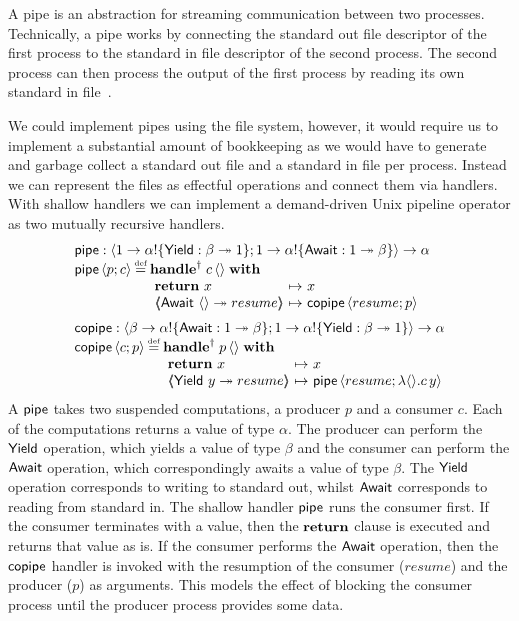 \documentclass[12pt,phd,lfcs,twoside,openright,logo,leftchapter,normalheadings]{infthesis}
\theoremstyle{plain}
\theoremstyle{definition}
\begin{document}
A \UNIX{} pipe is an abstraction for streaming communication between
two processes. Technically, a pipe works by connecting the standard
out file descriptor of the first process to the standard in file
descriptor of the second process. The second process can then process
the output of the first process by reading its own standard in
file~\cite{RitchieT74}.

We could implement pipes using the file system, however, it would
require us to implement a substantial amount of bookkeeping as we
would have to generate and garbage collect a standard out file and a
standard in file per process. Instead we can represent the files as
effectful operations and connect them via handlers.
%
With shallow handlers we can implement a demand-driven Unix pipeline
operator as two mutually recursive handlers.
%
\[
\bl
   \Pipe   : \Record{\UnitType \to \alpha \eff \{ \Yield : \beta \opto \UnitType \}; \UnitType \to \alpha\eff\{ \Await : \UnitType \opto \beta \}}          \to \alpha \\
   \Pipe\, \Record{p; c} \defas
        \bl
          \ShallowHandle\; c\,\Unit \;\With\; \\
           ~\ba[m]{@{}l@{~}c@{~}l@{}}
              \Return~x &\mapsto& x \\
              \OpCase{\Await}{\Unit}{resume}  &\mapsto& \Copipe\,\Record{resume; p} \\
            \ea
        \el\medskip\\

   \Copipe : \Record{\beta \to \alpha\eff\{ \Await : \UnitType \opto \beta\};    \UnitType \to \alpha\eff\{ \Yield : \beta \opto \UnitType\}} \to \alpha \\
   \Copipe\, \Record{c; p} \defas
      \bl
         \ShallowHandle\; p\,\Unit \;\With\; \\
          ~\ba[m]{@{}l@{~}c@{~}l@{}}
             \Return~x &\mapsto& x \\
             \OpCase{\Yield}{y}{resume} &\mapsto& \Pipe\,\Record{resume; \lambda \Unit. c\, y} \\
           \ea \\
      \el \\
\el
\]
%
A $\mathsf{pipe}$ takes two suspended computations, a producer $p$ and a
consumer $c$.
%
Each of the computations returns a value of type $\alpha$.
%
The producer can perform the $\mathsf{Yield}$ operation, which yields a value
of type $\beta$ and the consumer can perform the $\mathsf{Await}$ operation,
which correspondingly awaits a value of type $\beta$. The $\mathsf{Yield}$
operation corresponds to writing to standard out, whilst $\mathsf{Await}$
corresponds to reading from standard in.
%
The shallow handler $\mathsf{pipe}$ runs the consumer first. If the consumer
terminates with a value, then the $\mathbf{return}$ clause is executed and
returns that value as is. If the consumer performs the $\mathsf{Await}$
operation, then the $\mathsf{copipe}$ handler is invoked with the resumption
of the consumer ($resume$) and the producer ($p$) as arguments. This
models the effect of blocking the consumer process until the producer
process provides some data.
\end{document}
